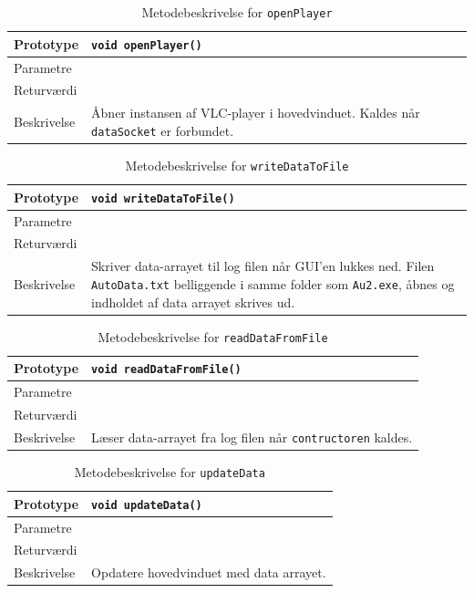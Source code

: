 \clearpage

\begin{table}[H]
\begin{tabularx}{\textwidth}{| l | Z |} \hline
Prototype & \texttt{void openPlayer()} \\\hline
Parametre &  \\\hline
Returværdi &  \\\hline
Beskrivelse & Åbner instansen af VLC-player i hovedvinduet. Kaldes når \texttt{dataSocket} er forbundet.  \\\hline
\end{tabularx}
\caption{Metodebeskrivelse for \texttt{openPlayer}}
\label{table:met_openPlayer}
\end{table}

\begin{table}[H]
\begin{tabularx}{\textwidth}{| l | Z |} \hline
Prototype & \texttt{void writeDataToFile()} \\\hline
Parametre &  \\\hline
Returværdi &  \\\hline
Beskrivelse & Skriver data-arrayet til log filen når GUI'en lukkes ned. Filen \texttt{AutoData.txt} belliggende i samme folder som \texttt{Au2.exe}, åbnes og indholdet af data arrayet skrives ud.  \\\hline
\end{tabularx}
\caption{Metodebeskrivelse for \texttt{writeDataToFile}}
\label{table:met_writeDataToFile}
\end{table}

\begin{table}[H]
\begin{tabularx}{\textwidth}{| l | Z |} \hline
Prototype & \texttt{void readDataFromFile()} \\\hline
Parametre &  \\\hline
Returværdi &  \\\hline
Beskrivelse & Læser data-arrayet fra log filen når \texttt{contructoren} kaldes.  \\\hline
\end{tabularx}
\caption{Metodebeskrivelse for \texttt{readDataFromFile}}
\label{table:met_readDataFromFile}
\end{table}

\begin{table}[H]
\begin{tabularx}{\textwidth}{| l | Z |} \hline
Prototype & \texttt{void updateData()} \\\hline
Parametre &  \\\hline
Returværdi &  \\\hline
Beskrivelse & Opdatere hovedvinduet med data arrayet. \\\hline
\end{tabularx}
\caption{Metodebeskrivelse for \texttt{updateData}}
\label{table:met_updateData}
\end{table}

\clearpage

